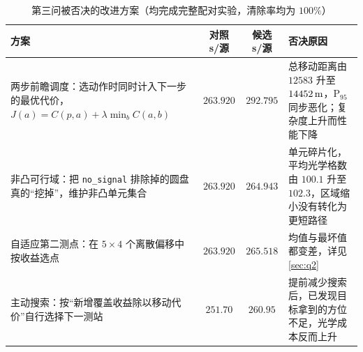 \begin{appendices}
\begin{table}[!htbp]
  \caption{第三问被否决的改进方案（均完成完整配对实验，清除率均为 $100\%$）}\label{tab:q3reject}\centering
  \begin{tabularx}{\textwidth}{>{\raggedright\arraybackslash}p{4.4cm} c c L}
    \toprule[1.5pt]
    方案 & 对照 s/源 & 候选 s/源 & 否决原因 \\
    \midrule[1pt]
    两步前瞻调度：选动作时同时计入下一步的最优代价，$J(a)=C(p,a)+\lambda\min_bC(a,b)$ & $263.920$ & $292.795$ & 总移动距离由 $12583$ 升至 $14452\,\mathrm{m}$，$\mathrm{P}_{95}$ 同步恶化；复杂度上升而性能下降 \\
    非凸可行域：把 \texttt{no\_signal} 排除掉的圆盘真的“挖掉”，维护非凸单元集合 & $263.920$ & $264.943$ & 单元碎片化，平均光学格数由 $100.1$ 升至 $102.3$，区域缩小没有转化为更短路径 \\
    自适应第二测点：在 $5\times4$ 个离散偏移中按收益选点 & $263.920$ & $265.518$ & 均值与最坏值都变差，详见\cref{sec:q2} \\
    主动搜索：按“新增覆盖收益除以移动代价”自行选择下一测站 & $251.70$ & $260.95$ & 提前减少搜索后，已发现目标拿到的方位不足，光学成本反而上升 \\
    \bottomrule[1.5pt]
  \end{tabularx}
\end{table}


\end{appendices}
